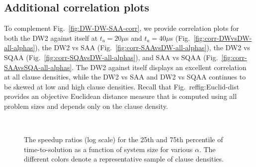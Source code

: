 \subsection{Additional correlation plots} \label{sec:correlationplots}
To complement Fig.~\ref{fig:DW-DW-SAA-corr}, we provide correlation plots for both the DW2 against itself at $t_a=20\mu$s and $t_a=40\mu$s (Fig.~\ref{fig:corr-DWvsDW-all-alphas}), the DW2 vs SAA (Fig.~\ref{fig:corr-SAAvsDW-all-alphas}), the DW2 vs SQAA (Fig.~\ref{fig:corr-SQAvsDW-all-alphas}), and SAA vs SQAA (Fig.~\ref{fig:corr-SAAvsSQA-all-alphas}. The DW2 against itself displays an excellent correlation at all clause densities, while the DW2 vs SAA and DW2 vs SQAA continues to be skewed at low and high clause densities. Recall that Fig.~ref{fig:Euclid-dist} provides an objective Euclidean distance measure that is computed using all problem sizes and depends only on the clause density.

\begin{figure}
\begin{center}
\\
\caption{
The speedup ratios (log scale) for the 25th and 75th percentile of time-to-solution as a function of system size for various $\alpha$. The different colors denote a representative sample of clause densities.}
\label{fig:speedup_25_75}
\end{center}
\end{figure}


